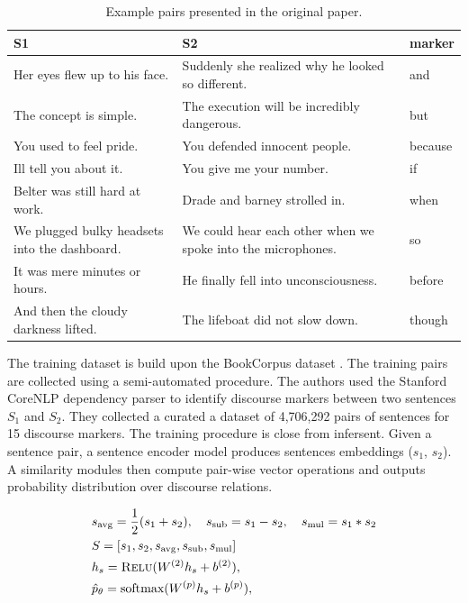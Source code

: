 \begin{table}[!htb]
\centering
\small
\begin{tabularx}{16cm}{@{}YYY@{}}
\toprule
S1  & S2  & marker\\
\midrule
\midrule 
Her eyes flew up to his face.
&Suddenly she realized why he looked so different.&
and\\
The concept is simple.
&The execution will be incredibly dangerous.&
but \\
You used to feel pride.
&You defended innocent people.&
because \\
Ill tell you about it.
&You give me your number.&
if \\
Belter was still hard at work.
&Drade and barney strolled in.&
when \\
We plugged bulky headsets into the dashboard.
&We could hear each other when we spoke into the microphones.&
so \\
It was mere minutes or hours.
&He finally fell into unconsciousness.&
before \\
And then the cloudy darkness lifted.
&The lifeboat did not slow down.&
though \\
\bottomrule
\end{tabularx}
\caption{Example pairs presented in the original paper.}
\end{table}

The training dataset is build upon the BookCorpus dataset \parencite{zhu_15}. The training pairs are collected using a semi-automated procedure. The authors used the Stanford CoreNLP dependency parser \parencite{schuster_16} to identify discourse markers between two sentences $S_1$ and $S_2$. They collected a curated a dataset of 4,706,292 pairs of sentences for 15 discourse markers. The training procedure is close from infersent. Given a sentence pair, a sentence encoder model produces sentences embeddings ($s_1$, $s_2$). A similarity modules then compute pair-wise vector operations and outputs probability distribution over discourse relations.

\begin{equation}
\begin{split}
    &s_{\text{avg}} = \frac{1}{2} (s_1 + s_2), ~~~s_{\text{sub}} = s_1 - s_2, ~~~s_{\text{mul}} = s_1 * s_2 \\
    &S = [s_1, s_2, s_{\text{avg}}, s_{\text{sub}}, s_{\text{mul}}]\\
    &h_s = \textsc{Relu}(W^{(2)}h_s + b^{(2)}), \\
    &\hat{p}_{\theta} = \text{softmax}(W^{(p)}h_s + b^{(p)}),\\
\end{split}
\label{eq:vec_op}
\end{equation}

